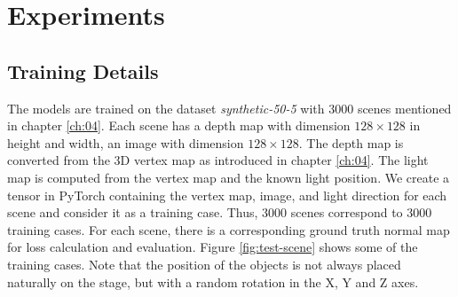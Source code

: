 
\chapter{Experiments} %

\section{Training Details}

The models are trained on the dataset \textit{synthetic-50-5} with 3000 scenes mentioned in chapter \ref{ch:04}. Each scene has a depth map with dimension $ 128\times 128 $ in height and width, an image with dimension $ 128\times 128 $. The depth map is converted from the 3D vertex map as introduced in chapter \ref{ch:04}. The light map is computed from the vertex map and the known light position. We create a tensor in PyTorch containing the vertex map, image, and light direction for each scene and consider it as a training case. Thus, 3000 scenes correspond to 3000 training cases. For each scene, there is a corresponding ground truth normal map for loss calculation and evaluation. Figure \ref{fig:test-scene} shows some of the training cases. Note that the position of the objects is not always placed naturally on the stage, but with a random rotation in the X, Y and Z axes.

